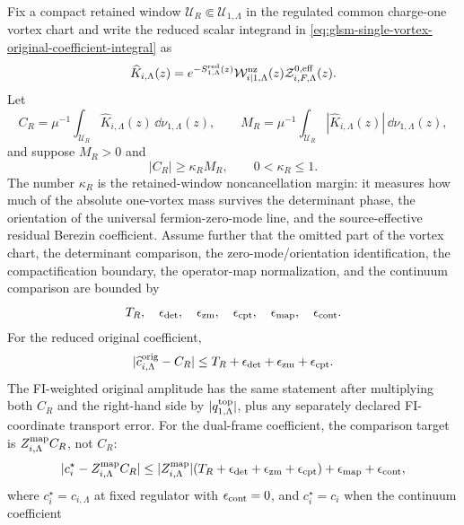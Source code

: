 \begin{controlledapproximation}
\label{ca:glsm-vortex-coefficient-noncancellation}
Fix a compact retained window
\(\mathcal U_R\Subset \mathcal U_{1,\Lambda}\) in the regulated common
charge-one vortex chart and write the reduced scalar integrand in
\eqref{eq:glsm-single-vortex-original-coefficient-integral} as
\[
  \widehat K_{i,\Lambda}(z)
  =
  e^{-S^{\rm red}_{1,\Lambda}(z)}
  \mathcal W_{i|1,\Lambda}^{\rm nz}(z)
  \mathcal Z^{0,{\rm eff}}_{i,F,\Lambda}(z).
\]
Let
\[
  C_R
  =
  \mu^{-1}\int_{\mathcal U_R}\widehat K_{i,\Lambda}(z)\,\dd\nu_{1,\Lambda}(z),
  \qquad
  M_R
  =
  \mu^{-1}\int_{\mathcal U_R}|\widehat K_{i,\Lambda}(z)|\,\dd\nu_{1,\Lambda}(z),
\]
and suppose \(M_R>0\) and
\[
  |C_R|\ge \kappa_R M_R,\qquad 0<\kappa_R\le 1 .
\]
The number \(\kappa_R\) is the retained-window noncancellation margin: it
measures how much of the absolute one-vortex mass survives the determinant
phase, the orientation of the universal fermion-zero-mode line, and the
source-effective residual Berezin coefficient.  Assume further that the
omitted part of the vortex chart, the determinant comparison, the
zero-mode/orientation identification, the compactification boundary, the
operator-map normalization, and the continuum comparison are bounded by
\[
  T_R,\quad
  \epsilon_{\rm det},\quad
  \epsilon_{\rm zm},\quad
  \epsilon_{\rm cpt},\quad
  \epsilon_{\rm map},\quad
  \epsilon_{\rm cont}.
\]
For the reduced original coefficient,
\begin{equation}
  |\widehat c^{\rm orig}_{i,\Lambda}-C_R|
  \le
  T_R+\epsilon_{\rm det}+\epsilon_{\rm zm}
  +\epsilon_{\rm cpt}.
  \label{eq:glsm-vortex-coefficient-noncancellation-bound}
\end{equation}
The FI-weighted original amplitude has the same statement after multiplying
both \(C_R\) and the right-hand side by
\(|q^{\rm top}_{1,\Lambda}|\), plus any separately declared FI-coordinate
transport error.  For the dual-frame coefficient, the comparison target is
\(Z^{\rm map}_{i,\Lambda}C_R\), not \(C_R\):
\begin{equation}
  |c_i^\star-Z^{\rm map}_{i,\Lambda}C_R|
  \le
  |Z^{\rm map}_{i,\Lambda}|
  (T_R+\epsilon_{\rm det}+\epsilon_{\rm zm}+\epsilon_{\rm cpt})
  +\epsilon_{\rm map}
  +\epsilon_{\rm cont},
  \label{eq:glsm-vortex-dual-coefficient-noncancellation-bound}
\end{equation}
where \(c_i^\star=c_{i,\Lambda}\) at fixed regulator with
\(\epsilon_{\rm cont}=0\), and \(c_i^\star=c_i\) when the continuum coefficient

\end{controlledapproximation}
